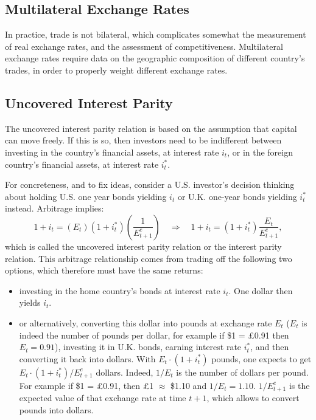 \documentclass[]{book}
\begin{document}
\subsection{Multilateral Exchange
Rates}\label{multilateral-exchange-rates}

In practice, trade is not bilateral, which complicates somewhat the
measurement of real exchange rates, and the assessment of
competitiveness. Multilateral exchange rates require data on the
geographic composition of different country's trades, in order to
properly weight different exchange rates.

\subsection{Uncovered Interest Parity}\label{uncovered-interest-parity}

The uncovered interest parity relation is based on the assumption that
capital can move freely. If this is so, then investors need to be
indifferent between investing in the country's financial assets, at
interest rate \(i_t\), or in the foreign country's financial assets, at
interest rate \(i_t^{*}\).

For concreteness, and to fix ideas, consider a U.S. investor's decision
thinking about holding U.S. one year bonds yielding \(i_t\) or U.K.
one-year bonds yielding \(i_t^{*}\) instead. Arbitrage implies:
\[1+i_{t}=\left(E_{t}\right)\left(1+i_{t}^{*}\right)\left(\frac{1}{E_{t+1}^{e}}\right)\quad\Rightarrow\quad\boxed{1+i_{t}=\left(1+i_{t}^{*}\right)\frac{E_{t}}{E_{t+1}^{e}}},\]
which is called the uncovered interest parity relation or the interest
parity relation. This arbitrage relationship comes from trading off the
following two options, which therefore must have the same returns:

\begin{itemize}
\item
  investing in the home country's bonds at interest rate \(i_t\). One
  dollar then yields \(i_t\).
\item
  or alternatively, converting this dollar into pounds at exchange rate
  \(E_t\) (\(E_t\) is indeed the number of pounds per dollar, for
  example if \$1 = £0.91 then \(E_t=0.91\)), investing it in U.K. bonds,
  earning interest rate \(i_t^{*}\), and then converting it back into
  dollars. With \(E_t \cdot (1+i_t^{*})\) pounds, one expects to get
  \(E_t \cdot (1+i_t^{*})/E_{t+1}^e\) dollars. Indeed, \(1/E_t\) is the
  number of dollars per pound. For example if \$1 = £0.91, then £1
  \(\approx\) \$1.10 and \(1/E_t=1.10\). \(1/E_{t+1}^e\) is the expected
  value of that exchange rate at time \(t+1\), which allows to convert
  pounds into dollars.
\end{itemize}
\end{document}
